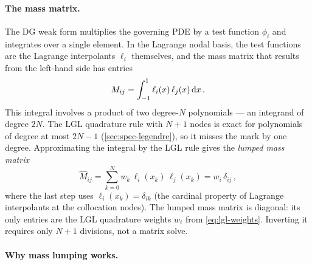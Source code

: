 \paragraph{The mass matrix.}

The DG weak form multiplies the governing PDE by a test function
$\phi_i$ and integrates over a single element.  In the Lagrange nodal
basis, the test functions are the Lagrange interpolants $\ell_i$
themselves, and the mass matrix that results from the left-hand side
has entries
%
\begin{equation}
  M_{ij} = \int_{-1}^{1} \ell_i(x)\,\ell_j(x)\,\mathrm{d} x \,.
  \label{eq:mass-matrix}
\end{equation}
%
This integral involves a product of two degree-$N$ polynomials ---
an integrand of degree $2N$.  The LGL quadrature rule with $N + 1$
nodes is exact for polynomials of degree at most $2N - 1$
(\cref{sec:spec-legendre}), so it misses the mark by one degree.
Approximating the integral by the LGL rule gives the
\emph{lumped mass matrix}
%
\begin{equation}
  \hat{M}_{ij}
  = \sum_{k=0}^{N} w_k\,\ell_i(x_k)\,\ell_j(x_k)
  = w_i\,\delta_{ij} \,,
  \label{eq:mass-lumped}
\end{equation}
%
where the last step uses $\ell_i(x_k) = \delta_{ik}$ (the cardinal
property of Lagrange interpolants at the collocation nodes).  The
lumped mass matrix is diagonal: its only entries are the LGL
quadrature weights $w_i$ from \cref{eq:lgl-weights}.  Inverting it
requires only $N + 1$ divisions, not a matrix solve.

\paragraph{Why mass lumping works.}

